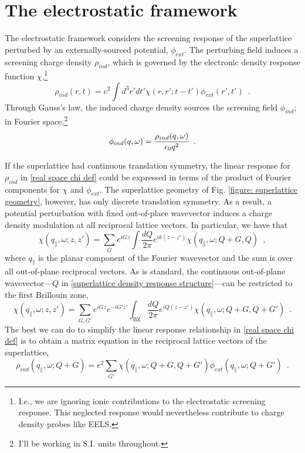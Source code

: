 \section{The electrostatic framework}
\label{section: electrostatic framework}

The electrostatic framework considers the screening response of the superlattice perturbed by an externally-sourced potential, $\phi_{ext}$.  The perturbing field induces a screening charge density $\rho_{ind}$, which is governed by the electronic density response function $\chi$,\footnote{I.e., we are ignoring ionic contributions to the electrostatic screening response.  This neglected response would nevertheless contribute to charge density probes like EELS.}
\begin{equation}
    \label{real space chi def}
    \rho_{ind}(r,t) = e^2\int d^3 r' dt' \chi(r,r';t-t')\phi_{ext}(r',t')
    \,\,\,.
\end{equation}
Through Gauss's law, the induced charge density sources the screening field $\phi_{ind}$; in Fourier space,\footnote{I'll be working in S.I. units throughout.}
\begin{equation}
    \label{Fourier induced Gauss law}
    \phi_{ind}(q,\omega) = \frac{\rho_{ind}(q,\omega)}{\epsilon_0 q^2}
    \,\,\,.
\end{equation}


If the superlattice had continuous translation symmetry, the linear response for $\rho_{ind}$ in \eqref{real space chi def} could be expressed in terms of the product of Fourier components for $\chi$ and $\phi_{ext}$.  The superlattice geometry of Fig. \ref{figure: superlattice geometry}, however, has only discrete translation symmetry.  As a result, a potential perturbation with fixed out-of-place wavevector induces a charge density modulation at all reciprocal lattice vectors.  In particular, we have that
\begin{equation}
    \label{superlattice density response structure}
    \chi(q_\parallel,\omega;z,z') = \sum_G e^{iG z} \int \frac{dQ}{2\pi} e^{ik(z-z')}\chi(q_\parallel,\omega;Q+G,Q)
    \,\,\,,
\end{equation}
where $q_\parallel$ is the planar component of the Fourier wavevector and the sum is over all out-of-plane reciprocal vectors.  As is standard, the continuous out-of-plane wavevector---$Q$ in \eqref{superlattice density response structure}---can be restricted to the first Brillouin zone,
\begin{equation}
    \chi(q_\parallel,\omega;z,z') = \sum_{G,G'} e^{iG z} e^{-i G' z'} \int_\text{BZ} \frac{dQ}{2\pi} e^{iQ(z-z')}\chi(q_\parallel,\omega;Q+G,Q+G')
    \,\,\,.
\end{equation}
The best we can do to simplify the linear response relationship in \eqref{real space chi def} is to obtain a matrix equation in the reciprocal lattice vectors of the superlattice,
\begin{equation}
     \rho_{ind}(q_\parallel,\omega;Q+G) = e^2\sum_{G'}\chi(q_\parallel,\omega;Q+G, Q+G')
     \phi_{ext}(q_\parallel,\omega;Q+G')
     \,\,\,.
\end{equation}

